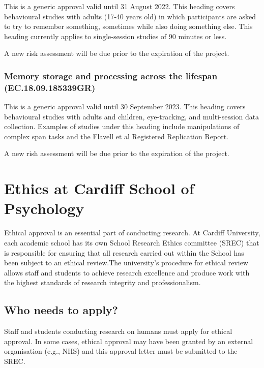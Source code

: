 \documentclass[12pt,]{book}
\theoremstyle{definition}
\theoremstyle{definition}
\theoremstyle{definition}
\theoremstyle{remark}
\begin{document}
This is a generic approval valid until 31 August 2022. This heading
covers behavioural studies with adults (17-40 years old) in which
participants are asked to try to remember something, sometimes while
also doing something else. This heading currently applies to
single-session studies of 90 minutes or less.

A new risk assessment will be due prior to the expiration of the
project.

\subsection{Memory storage and processing across the lifespan
(EC.18.09.185339GR)}\label{memory-storage-and-processing-across-the-lifespan-ec.18.09.185339gr}

This is a generic approval valid until 30 September 2023. This heading
covers behavioural studies with adults and children, eye-tracking, and
multi-session data collection. Examples of studies under this heading
include manipulations of complex span tasks and the Flavell et al
Registered Replication Report.

A new rish assessment will be due prior to the expiration of the
project.

\chapter{Ethics at Cardiff School of
Psychology}\label{ethics-at-cardiff-school-of-psychology}

Ethical approval is an essential part of conducting research. At Cardiff
University, each academic school has its own School Research Ethics
committee (SREC) that is responsible for ensuring that all research
carried out within the School has been subject to an ethical review.The
university's procedure for ethical review allows staff and students to
achieve research excellence and produce work with the highest standards
of research integrity and professionalism.

\section{Who needs to apply?}\label{who-needs-to-apply}

Staff and students conducting research on humans must apply for ethical
approval. In some cases, ethical approval may have been granted by an
external organisation (e.g., NHS) and this approval letter must be
submitted to the SREC.
\end{document}
